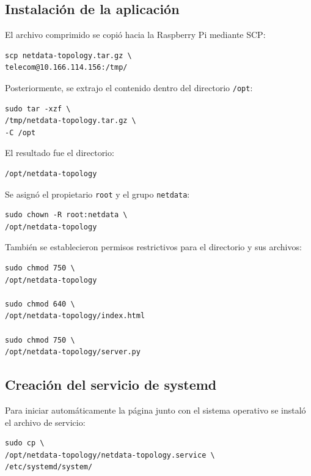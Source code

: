 \subsection{Instalación de la aplicación}

El archivo comprimido se copió hacia la Raspberry Pi mediante SCP:

\begin{lstlisting}[style=terminal]
scp netdata-topology.tar.gz \
telecom@10.166.114.156:/tmp/
\end{lstlisting}

Posteriormente, se extrajo el contenido dentro del directorio
\texttt{/opt}:

\begin{lstlisting}[style=terminal]
sudo tar -xzf \
/tmp/netdata-topology.tar.gz \
-C /opt
\end{lstlisting}

El resultado fue el directorio:

\begin{lstlisting}[style=terminal]
/opt/netdata-topology
\end{lstlisting}

Se asignó el propietario \texttt{root} y el grupo \texttt{netdata}:

\begin{lstlisting}[style=terminal]
sudo chown -R root:netdata \
/opt/netdata-topology
\end{lstlisting}

También se establecieron permisos restrictivos para el directorio y sus
archivos:

\begin{lstlisting}[style=terminal]
sudo chmod 750 \
/opt/netdata-topology

sudo chmod 640 \
/opt/netdata-topology/index.html

sudo chmod 750 \
/opt/netdata-topology/server.py
\end{lstlisting}

\subsection{Creación del servicio de systemd}

Para iniciar automáticamente la página junto con el sistema operativo se
instaló el archivo de servicio:

\begin{lstlisting}[style=terminal]
sudo cp \
/opt/netdata-topology/netdata-topology.service \
/etc/systemd/system/
\end{lstlisting}

